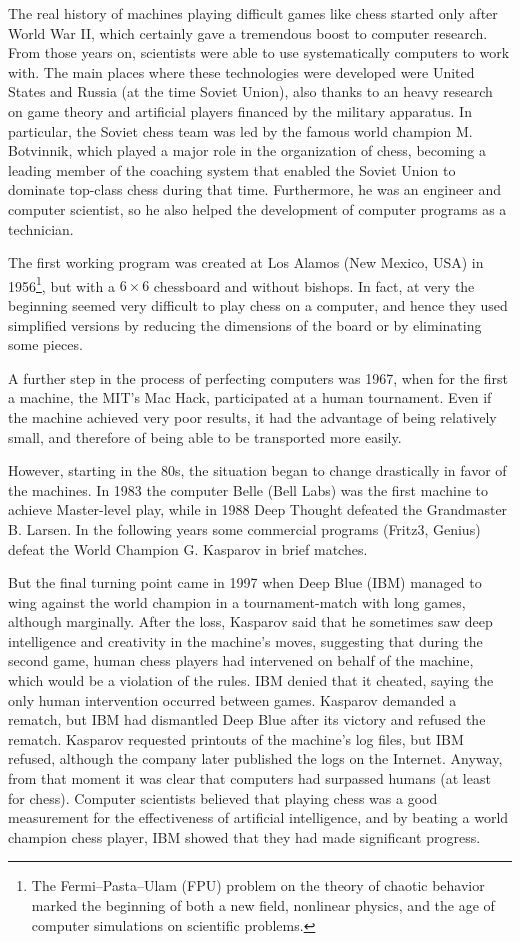 The real history of machines playing difficult games like chess started only after World War II, which certainly gave a tremendous boost to computer research. From those years on, scientists were able to use systematically computers to work with. The main places where these technologies were developed were United States and Russia (at the time Soviet Union), also thanks to an heavy research on game theory and artificial players financed by the military apparatus. In particular, the Soviet chess team was led by the famous world champion M. Botvinnik, which played a major role in the organization of chess, becoming a leading member of the coaching system that enabled the Soviet Union to dominate top-class chess during that time. Furthermore, he was an engineer and computer scientist, so he also helped the development of computer programs as a technician.

The first working program was created at Los Alamos (New Mexico, USA) in 1956\footnote{The Fermi--Pasta--Ulam (FPU) problem on the theory of chaotic behavior marked the beginning of both a new field, nonlinear physics, and the age of computer simulations on scientific problems.}, but with a $6\times6$ chessboard and without bishops. In fact, at very the beginning seemed very difficult to play chess on a computer, and hence they used simplified versions by reducing the dimensions of the board or by eliminating some pieces. 

A further step in the process of perfecting computers was 1967, when for the first a machine, the MIT's Mac Hack, participated at a human tournament. Even if the machine achieved very poor results, it had the advantage of being relatively small, and therefore of being able to be transported more easily.

However, starting in the 80s, the situation began to change drastically in favor of the machines. In 1983 the computer Belle (Bell Labs) was the first machine to achieve Master-level play, while in 1988 Deep Thought defeated the Grandmaster B. Larsen. In the following years some commercial programs (Fritz3, Genius) defeat the World Champion G. Kasparov in brief matches.

But the final turning point came in 1997 when Deep Blue (IBM) managed to wing against the world champion in a tournament-match with long games, although marginally. After the loss, Kasparov said that he sometimes saw deep intelligence and creativity in the machine's moves, suggesting that during the second game, human chess players had intervened on behalf of the machine, which would be a violation of the rules. IBM denied that it cheated, saying the only human intervention occurred between games. Kasparov demanded a rematch, but IBM had dismantled Deep Blue after its victory and refused the rematch. Kasparov requested printouts of the machine's log files, but IBM refused, although the company later published the logs on the Internet. Anyway, from that moment it was clear that computers had surpassed humans (at least for chess). Computer scientists believed that playing chess was a good measurement for the effectiveness of artificial intelligence, and by beating a world champion chess player, IBM showed that they had made significant progress.
